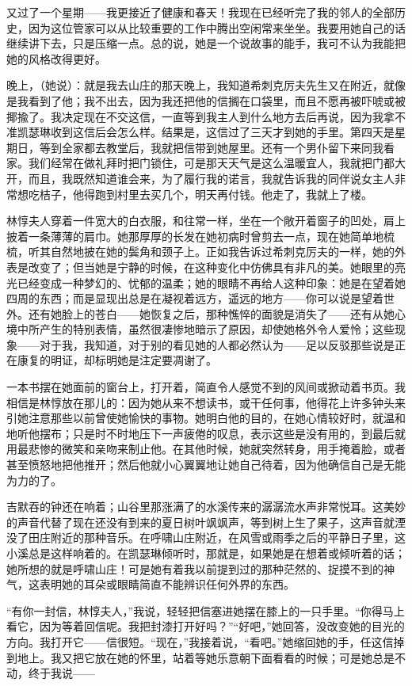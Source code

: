 \par 又过了一个星期——我更接近了健康和春天！我现在已经听完了我的邻人的全部历史，因为这位管家可以从比较重要的工作中腾出空闲常来坐坐。我要用她自己的话继续讲下去，只是压缩一点。总的说，她是一个说故事的能手，我可不认为我能把她的风格改得更好。
\par 晚上，（她说）：就是我去山庄的那天晚上，我知道希刺克厉夫先生又在附近，就像是我看到了他；我不出去，因为我还把他的信搁在口袋里，而且不愿再被吓唬或被揶揄了。我决定现在不交这信，一直等到我主人到什么地方去后再说，因为我拿不准凯瑟琳收到这信后会怎么样。结果是，这信过了三天才到她的手里。第四天是星期日，等到全家都去教堂后，我就把信带到她屋里。还有一个男仆留下来同我看家。我们经常在做礼拜时把门锁住，可是那天天气是这么温暖宜人，我就把门都大开，而且，我既然知道谁会来，为了履行我的诺言，我就告诉我的同伴说女主人非常想吃桔子，他得跑到村里去买几个，明天再付钱。他走了，我就上了楼。
\par 林惇夫人穿着一件宽大的白衣服，和往常一样，坐在一个敞开着窗子的凹处，肩上披着一条薄薄的肩巾。她那厚厚的长发在她初病时曾剪去一点，现在她简单地梳梳，听其自然地披在她的鬓角和颈子上。正如我告诉过希刺克厉夫的一样，她的外表是改变了；但当她是宁静的时候，在这种变化中仿佛具有非凡的美。她眼里的亮光已经变成一种梦幻的、忧郁的温柔；她的眼睛不再给人这种印象：她是在望着她四周的东西；而是显现出总是在凝视着远方，遥远的地方——你可以说是望着世外。还有她脸上的苍白——她恢复之后，那种憔悴的面貌是消失了——还有从她心境中所产生的特别表情，虽然很凄惨地暗示了原因，却使她格外令人爱怜；这些现象——对于我，我知道，对于别的看见她的人都必然认为——足以反驳那些说是正在康复的明证，却标明她是注定要凋谢了。
\par 一本书摆在她面前的窗台上，打开着，简直令人感觉不到的风间或掀动着书页。我相信是林惇放在那儿的：因为她从来不想读书，或干任何事，他得花上许多钟头来引她注意那些以前曾使她愉快的事物。她明白他的目的，在她心情较好时，就温和地听他摆布；只是时不时地压下一声疲倦的叹息，表示这些是没有用的，到最后就用最悲惨的微笑和亲吻来制止他。在其他时候，她就突然转身，用手掩着脸，或者甚至愤怒地把他推开；然后他就小心翼翼地让她自己待着，因为他确信自己是无能为力的了。
\par 吉默吞的钟还在响着；山谷里那涨满了的水溪传来的潺潺流水声非常悦耳。这美妙的声音代替了现在还没有到来的夏日树叶飒飒声，等到树上生了果子，这声音就湮没了田庄附近的那种音乐。在呼啸山庄附近，在风雪或雨季之后的平静日子里，这小溪总是这样响着的。在凯瑟琳倾听时，那就是，如果她是在想着或倾听着的话；她所想的就是呼啸山庄！可是她有着我以前提到过的那种茫然的、捉摸不到的神气，这表明她的耳朵或眼睛简直不能辨识任何外界的东西。
\par “有你一封信，林惇夫人，”我说，轻轻把信塞进她摆在膝上的一只手里。“你得马上看它，因为等着回信呢。我把封漆打开好吗？”“好吧，”她回答，没改变她的目光的方向。我打开它——信很短。“现在，”我接着说，“看吧。”她缩回她的手，任这信掉到地上。我又把它放在她的怀里，站着等她乐意朝下面看看的时候；可是她总是不动，终于我说——
